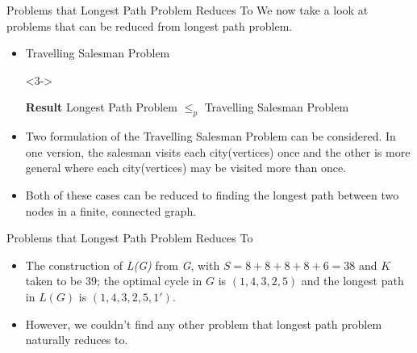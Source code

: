 \begin{frame}{Problems that Longest Path Problem Reduces To}
    We now take a look at problems that can be reduced from longest path problem.
    \begin{itemize}
        \item <2-> Travelling Salesman Problem
        \item[] <3-> \begin{block}{\textbf{Result}}
                {Longest Path Problem $\leq_p$ Travelling Salesman Problem}
            \end{block}
        \item <4-> Two formulation of the Travelling Salesman Problem can be considered. In one version, the salesman visits each city(vertices) once and the other is more general where each city(vertices) may be visited more than once.
        \item <5-> Both of these cases can be reduced to finding the longest path between two nodes in a finite, connected graph.
        
    \end{itemize}
\end{frame}

\begin{frame}{Problems that Longest Path Problem Reduces To}
    
    \begin{itemize}
        \item <1-> The construction of \textit{L(G)} from \textit{G}, with $S=8+8+8+8+6 = 38$ and $K$ taken to be $39$; the optimal cycle in $G$ is $(1,4,3,2,5)$ and the longest path in $L(G)$ is $(1,4,3,2,5,1')$.
        \item <2->However, we couldn't find any other problem that longest path problem naturally reduces to.
        
    \end{itemize}
\end{frame}

        
        
